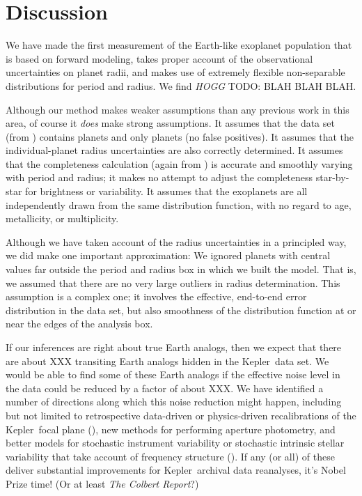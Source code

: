 \documentclass[12pt,preprint]{aastex}
\newcommand{\project}[1]{{\sffamily #1}}
\newcommand{\kepler}{\project{Kepler}}
\newcommand{\todo}[3]{{\color{#2} \emph{#1} TODO: #3}}
\newcommand{\hoggtodo}[1]{\todo{HOGG}{blue}{#1}}
\begin{document}
\section{Discussion}

We have made the first measurement of the Earth-like exoplanet population that
is based on forward modeling, takes proper account of the observational
uncertainties on planet radii, and makes use of extremely flexible
non-separable distributions for period and radius.
We find \hoggtodo{BLAH BLAH BLAH.}

Although our method makes weaker assumptions than any previous work in this
area, of course it \emph{does} make strong assumptions.
It assumes that the data set (from \citealt{petigura}) contains planets and
only planets (no false positives).
It assumes that the individual-planet radius uncertainties are also correctly
determined.
It assumes that the completeness calculation (again from \citealt{petigura})
is accurate and smoothly varying with period and radius; it makes no attempt
to adjust the completeness star-by-star for brightness or variability.
It assumes that the exoplanets are all independently drawn from the same
distribution function, with no regard to age, metallicity, or multiplicity.

Although we have taken account of the radius uncertainties in a principled
way, we did make one important approximation: We ignored planets with central
values far outside the period and radius box in which we built the model.
That is, we assumed that there are no very large outliers in radius
determination.
This assumption is a complex one; it involves the effective, end-to-end error
distribution in the data set, but also smoothness of the distribution function
at or near the edges of the analysis box.

If our inferences are right about true Earth analogs, then we expect that
there are about XXX transiting Earth analogs hidden in the \kepler\ data set.
We would be able to find some of these Earth analogs if the effective noise
level in the data could be reduced by a factor of about XXX.
We have identified a number of directions along which this noise reduction
might happen, including but not limited to retrospective data-driven or
physics-driven recalibrations of the \kepler\ focal plane
(\citealt{hoggwhitepaper}), new methods for performing aperture photometry,
and better models for stochastic instrument variability or stochastic
intrinsic stellar variability that take account of frequency structure
(\citealt{brewer, carter, roberts}).
If any (or all) of these deliver substantial improvements for \kepler\
archival data reanalyses, it's Nobel Prize time!  (Or at least \textsl{The
Colbert Report}?)
\end{document}
